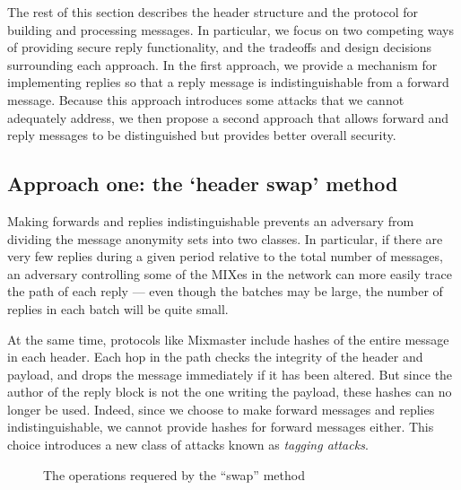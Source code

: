 \documentclass{llncs}
\begin{document}

The rest of this section describes the header structure and the
protocol for building and processing messages. In particular, we
focus on two competing ways of providing secure reply functionality,
and the tradeoffs and design decisions surrounding each approach. In
the first approach, we provide a mechanism for implementing replies so
that a reply message is indistinguishable from a forward message. Because this
approach introduces some attacks that we cannot adequately address, we
then propose a second approach that allows forward and reply messages
to be distinguished but provides better overall security.


\subsection{Approach one: the `header swap' method}
\label{subsec:header-swap}

Making forwards and replies indistinguishable prevents an adversary from
dividing the message anonymity sets into two classes. In particular, if
there are very few replies during a given period relative to the total
number of messages, an adversary controlling some of the MIXes in the
network can more easily trace the path of each reply --- even though
the batches may be large, the number of replies in each batch will be
quite small.

At the same time, protocols like Mixmaster include hashes of the entire
message in each header. Each hop in the path checks the integrity of
the header and payload, and drops the message immediately if it has been
altered. But since the author of the reply block is not the one writing
the payload, these hashes can no longer be used. Indeed, since we choose
to make forward messages and replies indistinguishable, we cannot provide
hashes for forward messages either. This choice introduces a new class
of attacks known as \emph{tagging attacks}.

\begin{figure}
\begin{center}
\caption{The operations requered by the ``swap'' method} 
\end{center}
\end{figure}
\end{document}
